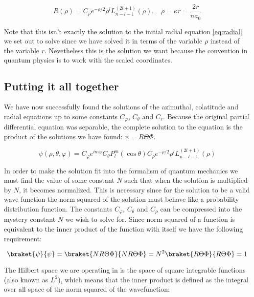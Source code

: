\documentclass{article}
\begin{document}
    \begin{equation}
        \label{eq:radial-solution}
        \boxed{R(\rho) = C_{\rho}e^{-\rho/2}\rho^{l}L^{(2l + 1)}_{n - l - 1}(\rho), \ \ \ \ \rho = \kappa r = \frac{2r}{na_0}}
    \end{equation}

    Note that this isn't exactly the solution to the initial radial equation \ref{eq:radial} we set out to solve since we have solved it in terms of the variable $\rho$ instead of the variable $r$.
    Nevetheless this is the solution we want because the convention in quantum physics is to work with the scaled coordinates.

    \subsection{Putting it all together}

    We have now successfully found the solutions of the azimuthal, colatitude and radial equations up to some constants $C_{\varphi}$, $C_{\theta}$ and $C_{r}$. Because the original partial
    differential equation was separable, the complete solution to the equation is the product of the solutions we have found: $\psi = R\Theta\Phi$.

    \begin{equation}
        \psi(\rho, \theta, \varphi) = C_{\varphi}e^{im\varphi}C_{\theta}P^{m}_{l}( \cos\theta)C_{\rho}e^{-\rho/2}\rho^{l}L^{(2l + 1)}_{n - l - 1}(\rho)
    \end{equation}

    In order to make the solution fit into the formalism of quantum mechanics we must find the value of some constant $N$ such that when the solution is multiplied by $N$, it becomes normalized.
    This is necessary since for the solution to be a valid wave function the norm squared of the solution must behave like a probability distribution function. The constants $C_{\varphi}$, $C_{\theta}$
    and $C_{\rho}$ can be compressed into the mystery constant $N$ we wish to solve for. Since norm squared of a function is equivalent to the inner product of the function with itself we have the
    following requirement:

    \begin{equation}
        \braket{\psi}{\psi} = \braket{NR\Theta\Phi}{NR\Theta\Phi} = N^2\braket{R\Theta\Phi}{R\Theta\Phi} = 1
    \end{equation}

    The Hilbert space we are operating in is the space of square integrable functions (also known as $L^2$), which means that the inner product is defined as the integral over all space
    of the norm squared of the wavefunction:
\end{document}
